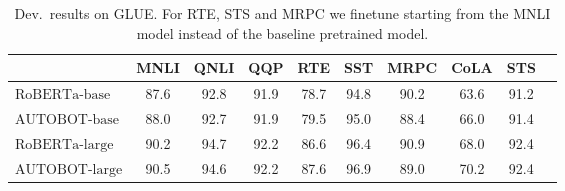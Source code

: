 \begin{table*}[ht]
\centering
\begin{tabular}{lccccccccc}
\toprule
& \bf MNLI & \bf QNLI & \bf QQP & \bf RTE & \bf SST & \bf MRPC & \bf CoLA & \bf STS \\
\midrule 
$\text{RoBERTa-base}$ & 87.6 & 92.8 & 91.9 & 78.7 & 94.8 & 90.2 & 63.6 & 91.2 \\
$\text{AUTOBOT-base}$ & 88.0 & 92.7 & 91.9 & 79.5 & 95.0 & 88.4 & 66.0 & 91.4 \\
\midrule 
$\text{RoBERTa-large}$ & 90.2 & 94.7 & 92.2 & 86.6 & 96.4 & 90.9 & 68.0 & 92.4 \\
$\text{AUTOBOT-large}$ & 90.5 & 94.6 & 92.2 & 87.6 & 96.9 & 89.0 & 70.2 & 92.4 \\
\bottomrule
\end{tabular} %
\caption{
Dev.~results on GLUE.
For RTE, STS and MRPC we finetune starting from the MNLI model instead of the baseline pretrained model.}

 

\label{tab:roberta_glue}
\end{table*}

